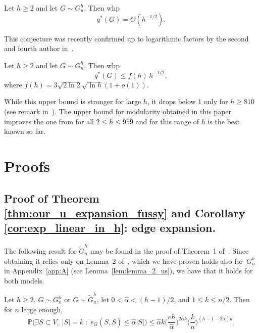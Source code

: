 \documentclass[runningheads, envcountsame, smallextended]{llncs}
\newcommand{\pr}{{\mathbb P}}
\newcommand{\q}{q^*}
\numberwithin{theorem}{section}
\numberwithin{definition}{section}
\numberwithin{lemma}{section}
\numberwithin{corollary}{section}
\numberwithin{proposition}{section}
\numberwithin{conjecture}{section}
\numberwithin{remark}{section}
\numberwithin{equation}{section}
\begin{document}
\begin{conjecture}
	Let $h\geq 2$ and let $G \sim G^h_n$. Then whp
	\[ \q(G) = \Theta(h^{-1/2}). \]     
\end{conjecture}
%
This conjecture was recently confirmed up to logarithmic factors by the second and fourth author in~\cite{rybarczyk2025modularity}. 
%
\begin{theorem}\label{thm.sqrth}
	Let $h\geq 2$ and let $G \sim G^h_n$. Then whp
	\[ \q(G) \leq f(h) \, h^{-1/2}, \] 
	where $f(h) = 3 \sqrt{2 \ln{2}} \sqrt{\ln{h}}(1+o(1))$. 
\end{theorem}
%
While this upper bound is stronger for large $h$, it drops below $1$ only for $h \geq 810$ (see remark in~\cite{rybarczyk2025modularity}). The upper bound for modularity obtained in this paper improves the one from \cite{rybarczyk2025modularity} for all $2 \leq h \leq 959$ and for this range of $h$ is the best known so far. 

\section{Proofs}

\subsection{Proof of Theorem \ref{thm:our_u_expansion_fussy} and Corollary \ref{cor:exp_linear_in_h}: edge expansion.} \label{sec:proofs_exp}


The following result for $\tilde{G}_n^h$ may be found in the proof of Theorem~1 of~\cite{mihail2006journal}. Since obtaining it relies only on Lemma~2 of~\cite{mihail2006journal}, which we have proven holds also for~$G^h_n$ in Appendix~\ref{app:A} (see Lemma~\ref{lem:lemma_2_us}), we have that it holds for both models. 

\begin{lemma}\label{lem:existingbound_k}
	Let $h \geq 2$, $G\sim G_n^h$ or $G \sim \tilde{G}_n^h$, let $0 <\hat\alpha < (h-1)/2$, and $1 \leq k \leq n/2$. 
	Then for $n$ large enough, 
	\[
	\pr \Big(\exists S \subset V,\; |S|=k \; : \; e_G(S, \bar{S} ) \leq \hat\alpha |S| \Big) \leq \hat\alpha k \bigg(\frac{eh}{\hat\alpha}\bigg)^{2\hat\alpha k} \bigg( \frac{k}{n}\bigg)^{(h-1-2\hat\alpha)k}.
	\]
\end{lemma}
\end{document}

